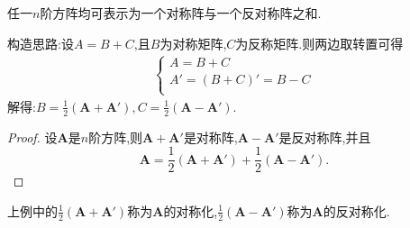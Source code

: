 \documentclass[../../main.tex]{subfiles}%
\begin{document}
\begin{proposition}\label{proposition:任一阶方阵可表示为对称阵与反对称阵之和}
任一\(n\)阶方阵均可表示为一个对称阵与一个反对称阵之和.
\end{proposition}
\begin{note}
构造思路:设$A=B+C$,且$B$为对称矩阵,$C$为反称矩阵.则两边取转置可得
\begin{align*}
\begin{cases}
A=B+C\\
A'=\left( B+C \right)'=B-C\\
\end{cases}
\end{align*}
解得:$B=\frac{1}{2}(\boldsymbol{A}+\boldsymbol{A}'),C=\frac{1}{2}(\boldsymbol{A}-\boldsymbol{A}')$.
\end{note}
\begin{proof}
设\(\boldsymbol{A}\)是\(n\)阶方阵,则\(\boldsymbol{A}+\boldsymbol{A}'\)是对称阵,\(\boldsymbol{A}-\boldsymbol{A}'\)是反对称阵,并且
\[
\boldsymbol{A}=\frac{1}{2}(\boldsymbol{A}+\boldsymbol{A}')+\frac{1}{2}(\boldsymbol{A}-\boldsymbol{A}').
\]
\end{proof}
\begin{remark}
上例中的\(\frac{1}{2}(\boldsymbol{A}+\boldsymbol{A}')\)称为\(\boldsymbol{A}\)的对称化,\(\frac{1}{2}(\boldsymbol{A}-\boldsymbol{A}')\)称为\(\boldsymbol{A}\)的反对称化.
\end{remark}
\end{document}
